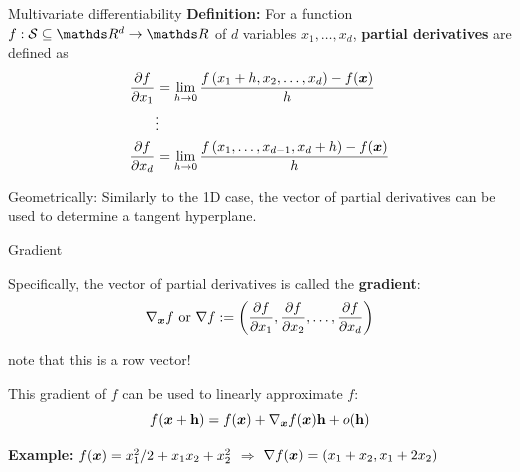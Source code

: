 \documentclass[11pt,compress,t,notes=noshow, xcolor=table]{beamer}
\begin{document}
\begin{framev}{Multivariate differentiability}
\textbf{Definition:} For a function $f: \mathcal{S}\subseteq \R^d \to \R$ of $d$ variables $x_1, \ldots, x_d$, \textbf{partial derivatives} are defined as
$$
\begin{aligned}
\frac{\partial f}{\partial x_1} & =\lim _{h \rightarrow 0} \frac{f\left(x_1+h, x_2, \ldots, x_d\right)-f(\bm{x})}{h} \\
& \vdots \\
\frac{\partial f}{\partial x_d} & =\lim _{h \rightarrow 0} \frac{f\left(x_1, \ldots, x_{d-1}, x_d+h\right)-f(\bm{x})}{h}
\end{aligned}
$$
\vfill
{}
\begin{center}
\begin{footnotesize}
Geometrically: Similarly to the 1D case, the vector of partial derivatives can be used to determine a tangent hyperplane.
\end{footnotesize}
\end{center}
\end{framev}


\begin{framei}{Gradient}
\item Specifically, the vector of partial derivatives is called the \textbf{gradient}:
$$
\nabla_{\bm{x}} f \text{ or } \nabla f :=
\left(\frac{\partial f}{\partial x_1}, \frac{\partial f}{\partial x_2}, \ldots, \frac{\partial f}{\partial x_d}\right)
$$
\begin{footnotesize}
note that this is a row vector!
\end{footnotesize}
\item This gradient of $f$ can be used to linearly approximate $f$:
$$
f(\bm{x}+\mathbf{h})=f(\bm{x})+\nabla_{\bm{x}}f(\bm{x}) \mathbf{h}+o(\mathbf{h})
$$
\item \textbf{Example:} $f(\bm{x}) = x_1^2/2 + x_1 x_2 + x_2^2$ $\Rightarrow$ $\nabla f(\bm{x}) = (x_1 + x_2, x_1 + 2x_2)$
\vfill
{}
\end{framei}
\end{document}
